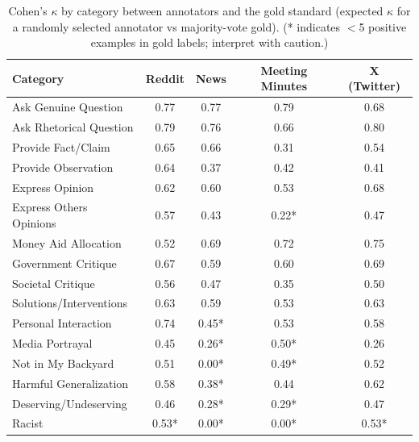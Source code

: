 \begin{table}[htbp]
\centering
\begin{tabular}{lcccc}
\toprule
Category & Reddit & News & Meeting Minutes & X (Twitter) \\
\midrule
Ask Genuine Question & 0.77 & 0.77 & 0.79 & 0.68 \\
Ask Rhetorical Question & 0.79 & 0.76 & 0.66 & 0.80 \\
Provide Fact/Claim & 0.65 & 0.66 & 0.31 & 0.54 \\
Provide Observation & 0.64 & 0.37 & 0.42 & 0.41 \\
Express Opinion & 0.62 & 0.60 & 0.53 & 0.68 \\
Express Others Opinions & 0.57 & 0.43 & 0.22* & 0.47 \\
Money Aid Allocation & 0.52 & 0.69 & 0.72 & 0.75 \\
Government Critique & 0.67 & 0.59 & 0.60 & 0.69 \\
Societal Critique & 0.56 & 0.47 & 0.35 & 0.50 \\
Solutions/Interventions & 0.63 & 0.59 & 0.53 & 0.63 \\
Personal Interaction & 0.74 & 0.45* & 0.53 & 0.58 \\
Media Portrayal & 0.45 & 0.26* & 0.50* & 0.26 \\
Not in My Backyard & 0.51 & 0.00* & 0.49* & 0.52 \\
Harmful Generalization & 0.58 & 0.38* & 0.44 & 0.62 \\
Deserving/Undeserving & 0.46 & 0.28* & 0.29* & 0.47 \\
Racist & 0.53* & 0.00* & 0.00* & 0.53* \\
\bottomrule
\end{tabular}
\caption{Cohen's $\kappa$ by category between annotators and the gold standard (expected $\kappa$ for a randomly selected annotator vs majority-vote gold). (* indicates $<$5 positive examples in gold labels; interpret with caution.)}
\label{tab:humans_vs_gold_kappa}
\end{table}